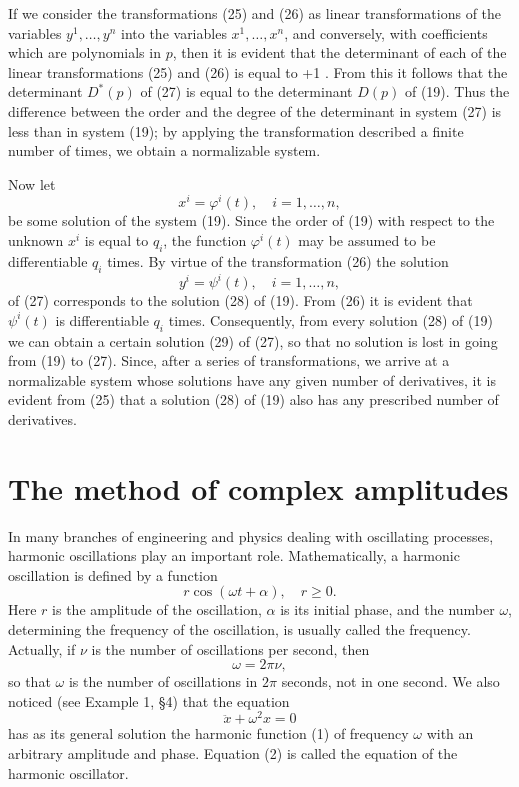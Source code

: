\documentclass[10pt,a5paper]{book}
\theoremstyle{plain}
\theoremstyle{definition}
\theoremstyle{remark}
\begin{document}
If we consider the transformations (25) and (26) as linear transformations of the variables $y^{1}, \ldots, y^{n}$ into the variables $x^{1}, \ldots, x^{n}$, and conversely, with coefficients which are polynomials in $p$, then it is evident that the determinant of each of the linear transformations (25) and (26) is equal to +1 . From this it follows that the determinant $D^{*}(p)$ of (27) is equal to the determinant $D(p)$ of (19). Thus the difference between the order and the degree of the determinant in system (27) is less than in system (19); by applying the transformation described a finite number of times, we obtain a normalizable system.

Now let
\begin{equation*}
x^{i}=\varphi^{i}(t), \quad i=1, \ldots, n, \tag{28}
\end{equation*}
be some solution of the system (19). Since the order of (19) with respect to the unknown $x^{i}$ is equal to $q_{i}$, the function $\varphi^{i}(t)$ may be assumed to be differentiable $q_{i}$ times. By virtue of the transformation (26) the solution
\begin{equation*}
y^{i}=\psi^{i}(t), \quad i=1, \ldots, n, \tag{29}
\end{equation*}
of (27) corresponds to the solution (28) of (19). From (26) it is evident that $\psi^{i}(t)$ is differentiable $q_{i}$ times. Consequently, from every solution (28) of (19) we can obtain a certain solution (29) of (27), so that no solution is lost in going from (19) to (27). Since, after a series of transformations, we arrive at a normalizable system whose solutions have any given number of derivatives, it is evident from (25) that a solution (28) of (19) also has any prescribed number of derivatives.

\section{The method of complex amplitudes}
In many branches of engineering and physics dealing with oscillating processes, harmonic oscillations play an important role. Mathematically, a harmonic oscillation is defined by a function
\begin{equation*}
r \cos (\omega t+\alpha), \quad r \geq 0 . \tag{1}
\end{equation*}
Here $r$ is the amplitude of the oscillation, $\alpha$ is its initial phase, and the number $\omega$, determining the frequency of the oscillation, is usually called the frequency. Actually, if $\nu$ is the number of oscillations per second, then
\[
\omega=2 \pi \nu,
\]
so that $\omega$ is the number of oscillations in $2 \pi$ seconds, not in one second. We also noticed (see Example 1, §4) that the equation
\begin{equation*}
\ddot{x}+\omega^{2} x=0 \tag{2}
\end{equation*}
has as its general solution the harmonic function (1) of frequency $\omega$ with an arbitrary amplitude and phase. Equation (2) is called the equation of the harmonic oscillator.
\end{document}
